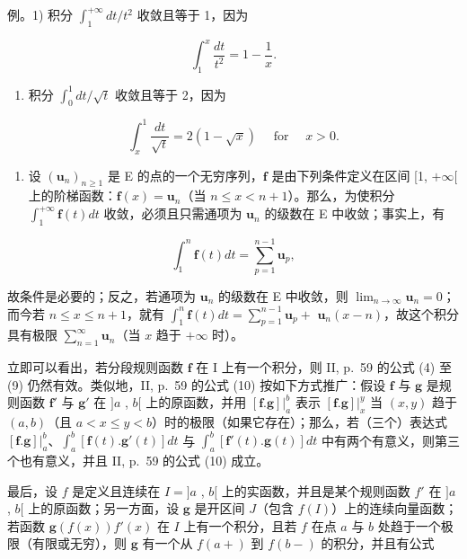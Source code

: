 例。1) 积分 \(\int_{1}^{+\infty} dt / t^{2}\) 收敛且等于 1，因为

\[
\int_ {1} ^ {x} \frac {d t}{t ^ {2}} = 1 - \frac {1}{x}.
\]

\begin{enumerate}
\def\labelenumi{\arabic{enumi})}
\setcounter{enumi}{1}
\tightlist
\item
  积分 \(\int_0^1 dt / \sqrt{t}\) 收敛且等于 2，因为
\end{enumerate}

\[
\int_ {x} ^ {1} \frac {d t}{\sqrt {t}} = 2 (1 - \sqrt {x}) \quad \text { for } \quad x > 0.
\]

\begin{enumerate}
\def\labelenumi{\arabic{enumi})}
\setcounter{enumi}{2}
\tightlist
\item
  设 \((\mathbf{u}_n)_{n\geqslant 1}\) 是 E 的点的一个无穷序列，\(\mathbf{f}\) 是由下列条件定义在区间 {[}1, \(+\infty[\) 上的阶梯函数：\(\mathbf{f}(x) = \mathbf{u}_n\)（当 \(n\leqslant x < n + 1\)）。那么，为使积分 \(\int_1^{+\infty}\mathbf{f}(t)dt\) 收敛，必须且只需通项为 \(\mathbf{u}_n\) 的级数在 E 中收敛；事实上，有
\end{enumerate}

\[
\int_ {1} ^ {n} \mathbf {f} (t) d t = \sum_ {p = 1} ^ {n - 1} \mathbf {u} _ {p},
\]

故条件是必要的；反之，若通项为 \(\mathbf{u}_n\) 的级数在 E 中收敛，则 \(\lim_{n\to \infty}\mathbf{u}_n = 0\)；而今若 \(n\leqslant x\leqslant n + 1\)，就有 \(\int_1^n\mathbf{f}(t)dt = \sum_{p = 1}^{n - 1}\mathbf{u}_p +\) \(\mathbf{u}_n(x - n)\)，故这个积分具有极限 \(\sum_{n = 1}^{\infty}\mathbf{u}_n\)（当 \(x\) 趋于 \(+\infty\) 时）。

立即可以看出，若分段规则函数 \(\mathbf{f}\) 在 I 上有一个积分，则 II, p.~59 的公式 (4) 至 (9) 仍然有效。类似地，II, p.~59 的公式 (10) 按如下方式推广：假设 \(\mathbf{f}\) 与 \(\mathbf{g}\) 是规则函数 \(\mathbf{f}'\) 与 \(\mathbf{g}'\) 在 \(]a\) , \(b[\) 上的原函数，并用 \([\mathbf{f}.\mathbf{g}]|_a^b\) 表示 \([\mathbf{f}.\mathbf{g}]|_x^y\) 当 \((x, y)\) 趋于 \((a, b)\)（且 \(a < x \leqslant y < b\)）时的极限（如果它存在）；那么，若（三个）表达式 \([\mathbf{f}.\mathbf{g}]|_a^b\)、\(\int_a^b [\mathbf{f}(t).\mathbf{g}'(t)] dt\) 与 \(\int_a^b [\mathbf{f}'(t).\mathbf{g}(t)] dt\) 中有两个有意义，则第三个也有意义，并且 II, p.~59 的公式 (10) 成立。

最后，设 \(f\) 是定义且连续在 \(I = ]a\) , \(b[\) 上的实函数，并且是某个规则函数 \(f'\) 在 \(]a\) , \(b[\) 上的原函数；另一方面，设 \(\mathbf{g}\) 是开区间 \(J\)（包含 \(f(I)\)）上的连续向量函数；若函数 \(\mathbf{g}(f(x))f'(x)\) 在 \(I\) 上有一个积分，且若 \(f\) 在点 \(a\) 与 \(b\) 处趋于一个极限（有限或无穷），则 \(\mathbf{g}\) 有一个从 \(f(a+)\) 到 \(f(b-)\) 的积分，并且有公式

